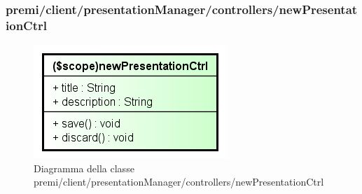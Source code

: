 \subsubsection{premi/client/presentationManager/controllers/newPresentationCtrl}
\begin{figure}[h]
\begin{center}
\includegraphics[scale=0.90]{img/diacla/newPresentationCtrl.png}
\caption{Diagramma della classe premi/client/presentationManager/controllers/newPresentationCtrl}
\end{center}
\end{figure}




